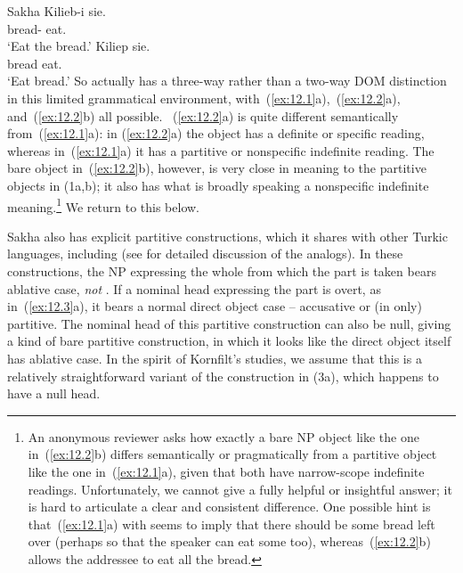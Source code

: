 \documentclass[output=paper]{langsci/langscibook}
\begin{document}
\ea\label{ex:12.2}Sakha
	\ea
		\gll Kilieb-i  sie.\\
			bread-\Acc{}  eat.\Imp{}\\
		\glt ‘Eat the bread.’
	\ex
		\gll Kiliep  sie.\\
			bread eat.\Imp{}\\
		\glt ‘Eat bread.’
	\z
\z
So  actually has a three-way rather than a two-way
\gls{DOM} distinction in this limited
grammatical environment, with~(\ref{ex:12.1}a),~(\ref{ex:12.2}a),
and~(\ref{ex:12.2}b) all possible. ~(\ref{ex:12.2}a) is quite different
semantically from~(\ref{ex:12.1}a): in (\ref{ex:12.2}a) the object has
a definite or specific reading, whereas in~(\ref{ex:12.1}a) it has a
partitive or nonspecific indefinite reading. The bare object
in~(\ref{ex:12.2}b), however, is very close in meaning to the
partitive objects in (1a,b); it also has what is broadly
speaking a nonspecific indefinite meaning.\footnote{An anonymous reviewer asks
    how exactly a bare NP object like the one in~(\ref{ex:12.2}b) differs
    semantically or pragmatically from a partitive object
    like the one in~(\ref{ex:12.1}a), given that both have narrow-scope
    indefinite readings.  Unfortunately, we cannot give a fully helpful or
    insightful answer; it is hard to articulate a clear and consistent
    difference.  One possible hint is that~(\ref{ex:12.1}a) with
     seems to imply that there should be some bread left
    over (perhaps so that the speaker can eat some too),
    whereas~(\ref{ex:12.2}b) allows the addressee to eat all the bread.}
    We return to this below.

Sakha also has explicit partitive constructions, which it shares with other
Turkic languages, including  (see
\citealt{Kornfilt1990,Kornfilt1996} for
detailed discussion of the  analogs). In these constructions, the
NP expressing the whole from which the part is taken bears ablative case,
\emph{not} . If a nominal head expressing the part is
overt, as in~(\ref{ex:12.3}a), it bears a normal direct object
case -- accusative or (in  only) partitive. The nominal head of
this partitive construction can also be null, giving a kind of bare partitive
construction, in which it looks like the direct object itself has ablative
case. In the spirit of Kornfilt’s studies, we assume that this is a relatively
straightforward variant of the construction in (3a), which happens to have a
null head.
\end{document}
